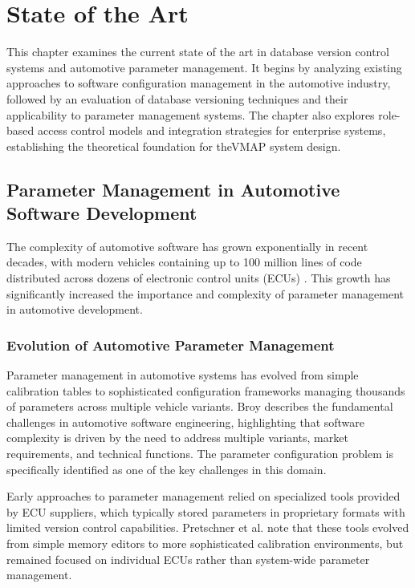 \chapter{State of the Art}
\label{chap:state-of-art}

This chapter examines the current state of the art in database version control systems and automotive parameter management. It begins by analyzing existing approaches to software configuration management in the automotive industry, followed by an evaluation of database versioning techniques and their applicability to parameter management systems. The chapter also explores role-based access control models and integration strategies for enterprise systems, establishing the theoretical foundation for the\ac{VMAP} system design.

\section{Parameter Management in Automotive Software Development}
\label{sec:parameter-management}

The complexity of automotive software has grown exponentially in recent decades, with modern vehicles containing up to 100 million lines of code distributed across dozens of electronic control units (ECUs) \cite{pretschner2007software}. This growth has significantly increased the importance and complexity of parameter management in automotive development.

\subsection{Evolution of Automotive Parameter Management}
\label{subsec:evolution-parameter-management}

Parameter management in automotive systems has evolved from simple calibration tables to sophisticated configuration frameworks managing thousands of parameters across multiple vehicle variants. Broy \cite{broy2006challenges} describes the fundamental challenges in automotive software engineering, highlighting that software complexity is driven by the need to address multiple variants, market requirements, and technical functions. The parameter configuration problem is specifically identified as one of the key challenges in this domain.

Early approaches to parameter management relied on specialized tools provided by \ac{ECU} suppliers, which typically stored parameters in proprietary formats with limited version control capabilities. Pretschner et al. \cite{pretschner2007software} note that these tools evolved from simple memory editors to more sophisticated calibration environments, but remained focused on individual \acp{ECU} rather than system-wide parameter management.


